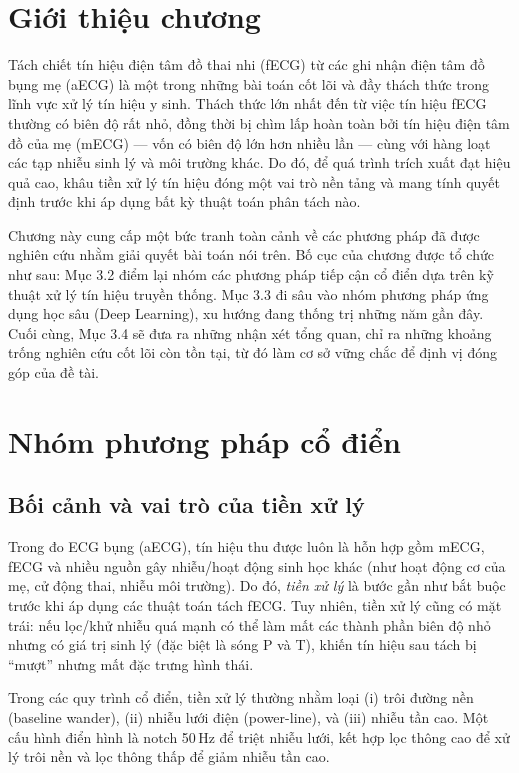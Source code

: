 \documentclass[../DoAn.tex]{subfiles}
\begin{document}

\section{Giới thiệu chương}

Tách chiết tín hiệu điện tâm đồ thai nhi (fECG) từ các ghi nhận điện tâm đồ bụng mẹ (aECG) là một trong những bài toán cốt lõi và đầy thách thức trong lĩnh vực xử lý tín hiệu y sinh. Thách thức lớn nhất đến từ việc tín hiệu fECG thường có biên độ rất nhỏ, đồng thời bị chìm lấp hoàn toàn bởi tín hiệu điện tâm đồ của mẹ (mECG) --- vốn có biên độ lớn hơn nhiều lần --- cùng với hàng loạt các tạp nhiễu sinh lý và môi trường khác. Do đó, để quá trình trích xuất đạt hiệu quả cao, khâu tiền xử lý tín hiệu đóng một vai trò nền tảng và mang tính quyết định trước khi áp dụng bất kỳ thuật toán phân tách nào.

Chương này cung cấp một bức tranh toàn cảnh về các phương pháp đã được nghiên cứu nhằm giải quyết bài toán nói trên. Bố cục của chương được tổ chức như sau: Mục 3.2 điểm lại nhóm các phương pháp tiếp cận cổ điển dựa trên kỹ thuật xử lý tín hiệu truyền thống. Mục 3.3 đi sâu vào nhóm phương pháp ứng dụng học sâu (Deep Learning), xu hướng đang thống trị những năm gần đây. Cuối cùng, Mục 3.4 sẽ đưa ra những nhận xét tổng quan, chỉ ra những khoảng trống nghiên cứu cốt lõi còn tồn tại, từ đó làm cơ sở vững chắc để định vị đóng góp của đề tài.

\section{Nhóm phương pháp cổ điển}

\subsection{Bối cảnh và vai trò của tiền xử lý}
Trong đo ECG bụng (aECG), tín hiệu thu được luôn là hỗn hợp gồm mECG, fECG và nhiều nguồn gây nhiễu/hoạt động sinh học khác (như hoạt động cơ của mẹ, cử động thai, nhiễu môi trường). Do đó, \textit{tiền xử lý} là bước gần như bắt buộc trước khi áp dụng các thuật toán tách fECG. Tuy nhiên, tiền xử lý cũng có mặt trái: nếu lọc/khử nhiễu quá mạnh có thể làm mất các thành phần biên độ nhỏ nhưng có giá trị sinh lý (đặc biệt là sóng P và T), khiến tín hiệu sau tách bị “mượt” nhưng mất đặc trưng hình thái.

Trong các quy trình cổ điển, tiền xử lý thường nhằm loại (i) trôi đường nền (baseline wander), (ii) nhiễu lưới điện (power-line), và (iii) nhiễu tần cao. Một cấu hình điển hình là notch 50\,Hz để triệt nhiễu lưới, kết hợp lọc thông cao để xử lý trôi nền và lọc thông thấp để giảm nhiễu tần cao.
\end{document}
